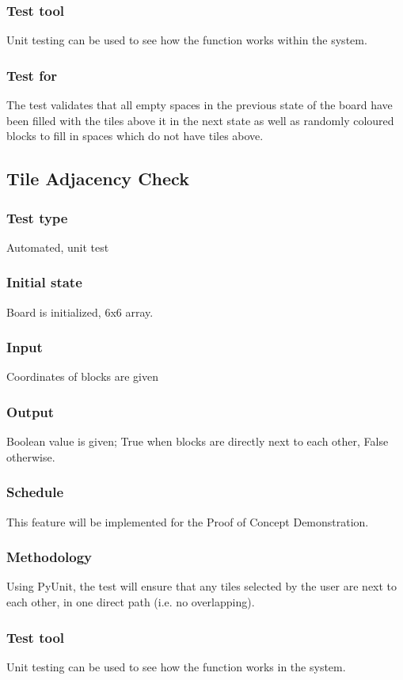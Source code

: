 \documentclass[12pt]{article}
\begin{document}
\subsubsection{Test tool}
Unit testing can be used to see how the function works within the system.
\subsubsection{Test for}
The test validates that all empty spaces in the previous state of the board have been ﬁlled with the tiles above it in the next state as well as randomly coloured blocks to ﬁll in spaces which do not have tiles above.

\newpage

\subsection{Tile Adjacency Check}
\subsubsection{Test type}
Automated, unit test
\subsubsection{Initial state}
Board is initialized, 6x6 array. 
\subsubsection{Input}
Coordinates of blocks are given
\subsubsection{Output}
Boolean value is given; True when blocks are directly next to each other, False otherwise.
\subsubsection{Schedule}
This feature will be implemented for the Proof of Concept Demonstration.
\subsubsection{Methodology}
Using PyUnit, the test will ensure that any tiles selected by the user are next to each other, in one direct path (i.e. no overlapping).
\subsubsection{Test tool}
Unit testing can be used to see how the function works in the system.
\end{document}
